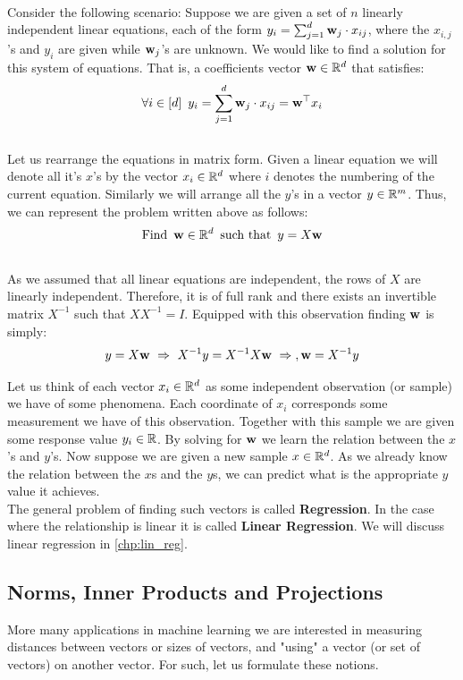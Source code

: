 ~\\
\begin{example}
Consider the following scenario: Suppose we are given a set of $n$ linearly independent linear equations, each of the form $y_i=\sum_{j=1}^{d}\mathbf{w}_j\cdot x_{ij}$, where the $x_{i,j}$'s and $y_i$ are given while $\mathbf{w}_j$'s are unknown. We would like to find a solution for this system of equations. That is, a coefficients vector $\mathbf{w}\in\mathbb{R}^d$ that satisfies:
$$ \forall i\in[d] \,\,\, y_i=\sum_{j=1}^d \mathbf{w}_j \cdot x_{ij} = \mathbf{w}^\top x_i$$
~\\
Let us rearrange the equations in matrix form. Given a linear equation we will denote all it's $x$'s by the vector $x_i\in\mathbb{R}^d$ where $i$ denotes the numbering of the current equation. Similarly we will arrange all the $y$'s in a vector $y\in\mathbb{R}^m$. Thus, we can represent the problem written above as follows:
$$  \text{Find}  \,\,\,\mathbf{w}\in\mathbb{R}^d \,\,\, \text{such that}\,\,\, y=X\mathbf{w}$$
~\\
As we assumed that all linear equations are independent, the rows of $X$ are linearly independent. Therefore, it is of full rank and there exists an invertible matrix $X^{-1}$ such that $XX^{-1}=I$. Equipped with this observation finding $\mathbf{w}$ is simply:
$$ y=X\mathbf{w} \,\, \Rightarrow \,\, X^{-1}y=X^{-1}X\mathbf{w} \,\, \Rightarrow \\, \mathbf{w}=X^{-1}y$$
\end{example}

\begin{remark}
Let us think of each vector $x_i\in\mathbb{R}^d$ as some independent observation (or sample) we have of some phenomena. Each coordinate of $x_i$ corresponds some measurement we have of this observation. Together with this sample we are given some response value $y_i\in\mathbb{R}$. By solving for $\mathbf{w}$ we learn the relation between the $x$'s and $y$'s. Now suppose we are given a new sample $x\in\mathbb{R}^d$. As we already know the relation between the $x$s and the $y$s, we can predict what is the appropriate $y$ value it achieves.
~\\
The general problem of finding such vectors is called \textbf{Regression}. In the case where the relationship is linear it is called \textbf{Linear Regression}. We will discuss linear regression in \autoref{chp:lin_reg}.
\end{remark}

\subsection{Norms, Inner Products and Projections}
More many applications in machine learning we are interested in measuring distances between vectors or sizes of vectors, and "using" a vector (or set of vectors) on another vector. For such, let us formulate these notions.

